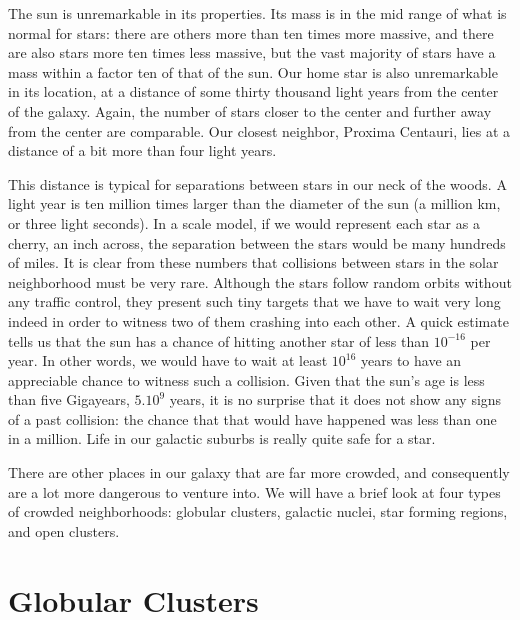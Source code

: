 \documentclass{book}
\begin{document}
The sun is unremarkable in its properties.  Its mass is in
the mid range of what is normal for stars: there are others more than
ten times more massive, and there are also stars more ten times less
massive, but the vast majority of stars have a mass within a factor
ten of that of the sun.  Our home star is also unremarkable in its
location, at a distance of some thirty thousand light years from the
center of the galaxy.  Again, the number of stars closer to the center
and further away from the center are comparable.  Our closest neighbor,
Proxima Centauri, lies at a distance of a bit more than four light years.

This distance is typical for separations between stars in our neck of
the woods.  A light year is ten million times larger than the diameter
of the sun (a million km, or three light seconds).  In a scale model,
if we would represent each star as a cherry, an inch across, the
separation between the stars would be many hundreds of miles.  It is
clear from these numbers that collisions between stars in the solar
neighborhood must be very rare.  Although the stars follow random
orbits without any traffic control, they present such tiny targets
that we have to wait very long indeed in order to witness two of them
crashing into each other.  A quick estimate tells us that the sun has
a chance of hitting another star of less than  $10^{-16}$
per year.  In other words, we would have to wait at least
 $10^{16}$ years to have an appreciable chance to witness
such a collision.  Given that the sun's age is less than five Gigayears,
 $5.10^9$ years, it is no surprise that it does not show
any signs of a past collision: the chance that that would have
happened was less than one in a million.  Life in our galactic suburbs
is really quite safe for a star.

There are other places in our galaxy that are far more crowded, and
consequently are a lot more dangerous to venture into.  We will have
a brief look at four types of crowded neighborhoods: globular
clusters, galactic nuclei, star forming regions, and open clusters.

\section{  Globular Clusters}
\label{sect:6}


\renewcommand{\thefootnote}{\fnsymbol{footnote}}
\end{document}

